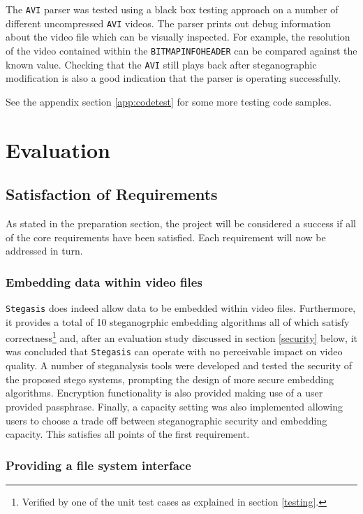 \documentclass[paper=a4, fontsize=11pt,twoside]{scrartcl}
\numberwithin{table}{section}
\numberwithin{figure}{section}
\numberwithin{algorithm}{section}
\begin{document}
The \texttt{AVI} parser was tested using a black box testing approach on a number of different uncompressed \texttt{AVI} videos. The parser prints out debug information about the video file which can be visually inspected. For example, the resolution of the video contained within the \texttt{BITMAPINFOHEADER} can be compared against the known value. Checking that the \texttt{AVI} still plays back after steganographic modification is also a good indication that the parser is operating successfully.

See the appendix section \ref{app:codetest} for some more testing code samples. 

\vfill
\pagebreak

\section{Evaluation}
\subsection{Satisfaction of Requirements}

As stated in the preparation section, the project will be considered a success if all of the core requirements have been satisfied. Each requirement will now be addressed in turn.

\subsubsection{Embedding data within video files}

\texttt{Stegasis} does indeed allow data to be embedded within video files. Furthermore, it provides a total of 10 steganogrphic embedding algorithms all of which satisfy correctness\footnote{Verified by one of the unit test cases as explained in section \ref{testing}.} and, after an evaluation study discussed in section \ref{security} below, it was concluded that \texttt{Stegasis} can operate with no perceivable impact on video quality. A number of steganalysis tools were developed and tested the security of the proposed stego systems, prompting the design of more secure embedding algorithms. Encryption functionality is also provided making use of a user provided passphrase. Finally, a capacity setting was also implemented allowing users to choose a trade off between steganographic security and embedding capacity. This satisfies all points of the first requirement.

\subsubsection{Providing a file system interface}
\end{document}
